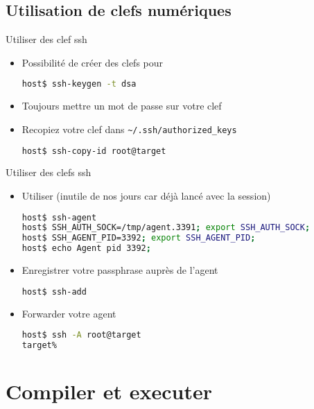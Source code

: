 \subsection{Utilisation de clefs numériques}

\begin{frame}[fragile=singleslide]{Utiliser des clef ssh}
  \begin{itemize}
  \item Possibilité de créer des clefs pour 
\begin{lstlisting}[language=sh]
host$ ssh-keygen -t dsa
\end{lstlisting} %
  \item Toujours mettre un mot de passe sur votre clef
  \item Recopiez votre clef dans \verb+~/.ssh/authorized_keys+
\begin{lstlisting}[language=sh]
host$ ssh-copy-id root@target
\end{lstlisting} %
  \end{itemize}
\end{frame}

\begin{frame}[fragile=singleslide]{Utiliser des clefs ssh}
  \begin{itemize}
  \item Utiliser  (inutile de nos jours car déjà lancé avec la session)
\begin{lstlisting}[language=sh]
host$ ssh-agent
host$ SSH_AUTH_SOCK=/tmp/agent.3391; export SSH_AUTH_SOCK;
host$ SSH_AGENT_PID=3392; export SSH_AGENT_PID;
host$ echo Agent pid 3392;
\end{lstlisting} %
  \item Enregistrer votre passphrase auprès de l'agent
\begin{lstlisting}[language=sh]
host$ ssh-add
\end{lstlisting} %
  \item Forwarder votre agent
\begin{lstlisting}[language=sh]
host$ ssh -A root@target
target%
\end{lstlisting} %
  \end{itemize}
\end{frame}


\section{Compiler et executer}

